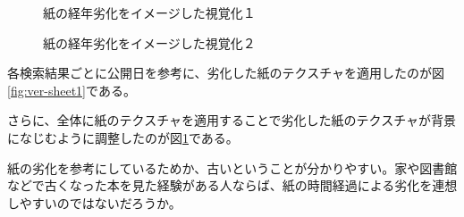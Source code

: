 \begin{figure}[htbp]
  \begin{minipage}{0.5\hsize}
    \begin{center}
    \end{center}
    \caption{紙の経年劣化をイメージした視覚化１}
    \label{fig:ver-sheet1}
  \end{minipage}
  \begin{minipage}{0.5\hsize}
    \begin{center}
    \end{center}
    \caption{紙の経年劣化をイメージした視覚化２}
    \label{fig:ver-sheet2}
  \end{minipage}
\end{figure}

各検索結果ごとに公開日を参考に、劣化した紙のテクスチャを適用したのが図\ref{fig:ver-sheet1}である。

さらに、全体に紙のテクスチャを適用することで劣化した紙のテクスチャが背景になじむように調整したのが図\ref{fig:ver-sheet2}である。

紙の劣化を参考にしているためか、古いということが分かりやすい。家や図書館などで古くなった本を見た経験がある人ならば、紙の時間経過による劣化を連想しやすいのではないだろうか。

